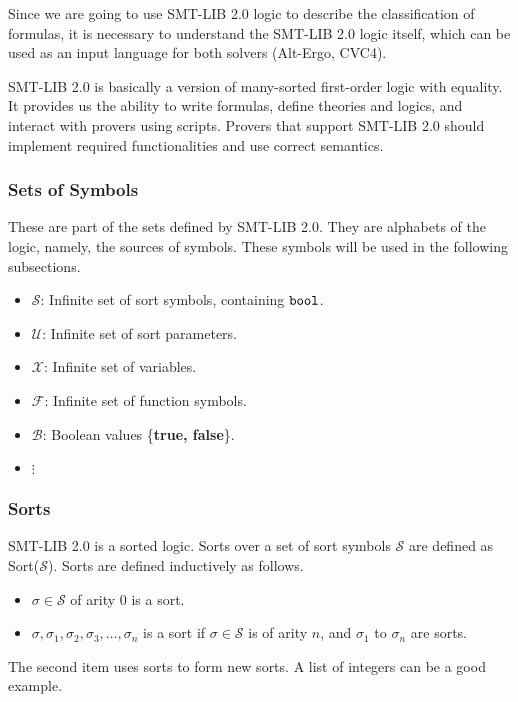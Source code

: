 \documentclass[10pt,twocolumn,letter]{article}
\theoremstyle{definition}
\begin{document}
Since we are going to use SMT-LIB 2.0 logic to describe the classification of formulas, it is necessary to understand the SMT-LIB 2.0 logic itself, which can be used as an input language for both solvers (Alt-Ergo, CVC4).

SMT-LIB 2.0 is basically a version of many-sorted first-order logic with equality\cite{bs2010}. It provides us the ability to write formulas, define theories and logics, and interact with provers using scripts. Provers that support SMT-LIB 2.0 should implement required functionalities and use correct semantics.

\subsubsection{Sets of Symbols}

These are part of the sets defined by SMT-LIB 2.0\cite{barrett:smt-lib:2010}. They are alphabets of the logic, namely, the sources of symbols. These symbols will be used in the following subsections.
\begin{itemize}
\item $\mathcal{S}$: Infinite set of sort symbols, containing $\tt bool$.
\item $\mathcal{U}$: Infinite set of sort parameters.
\item $\mathcal{X}$: Infinite set of variables.
\item $\mathcal{F}$: Infinite set of function symbols.
\item $\mathcal{B}$: Boolean values \{{\bf true, false}\}.
\item \qquad$\vdots$
\end{itemize}



\subsubsection{Sorts}

SMT-LIB 2.0 is a sorted logic. Sorts over a set of sort symbols $\mathcal{S}$ are defined as Sort($\mathcal{S}$). Sorts are defined inductively as follows.

\begin{itemize}
\item $\sigma \in \mathcal{S}$ of arity 0 is a sort.
\item $\sigma,\sigma_1, \sigma_2, \sigma_3, \ldots, \sigma_n$ is a sort if $\sigma \in \mathcal{S}$ is of arity $n$, and $\sigma_1$ to $\sigma_n$ are sorts.
\end{itemize}
The second item uses sorts to form new sorts. A list of integers can be a good example.
\end{document}
